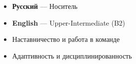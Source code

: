 
\twocolumnsection
{
\vspace{1em}
\begin{itemize}
   \item{} {\textbf{Русский}} --- Носитель
   \item{} {\textbf{English}} --- Upper-Intermediate (B2)
\end{itemize}}
{
\vspace{1em}
\begin{itemize}
   \item Наставничество и работа в команде
   \item Адаптивность и дисциплинированность
\end{itemize}}
